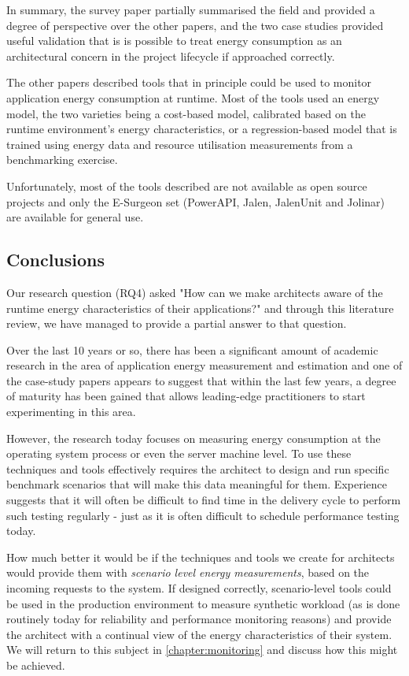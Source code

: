 In summary, the survey paper partially summarised the field and provided a degree of perspective over the other papers, and the two case studies provided useful validation that is is possible to treat energy consumption as an architectural concern in the project lifecycle if approached correctly.

The other papers described tools that in principle could be used to monitor application energy consumption at runtime.  Most of the tools used an energy model, the two varieties being a cost-based model, calibrated based on the runtime environment's energy characteristics, or a regression-based model that is trained using energy data and resource utilisation measurements from a benchmarking exercise.

Unfortunately, most of the tools described are not available as open source projects and only the E-Surgeon set (PowerAPI, Jalen, JalenUnit and Jolinar) are available for general use.


\subsection{Conclusions}

Our research question (RQ4) asked "How can we make architects aware of the runtime energy characteristics of their applications?" and through this literature review, we have managed to provide a partial answer to that question.

Over the last 10 years or so, there has been a significant amount of academic research in the area of application energy measurement and estimation and one of the case-study papers \cite{jagroep2016-comparingreleases} appears to suggest that within the last few years, a degree of maturity has been gained that allows leading-edge practitioners to start experimenting in this area.

However, the research today focuses on measuring energy consumption at the operating system process or even the server machine level.  To use these techniques and tools effectively requires the architect to design and run specific benchmark scenarios that will make this data meaningful for them.  Experience suggests that it will often be difficult to find time in the delivery cycle to perform such testing regularly - just as it is often difficult to schedule performance testing today.

How much better it would be if the techniques and tools we create for architects would provide them with \emph{scenario level energy measurements}, based on the incoming requests to the system.  If designed correctly, scenario-level tools could be used in the production environment to measure synthetic workload (as is done routinely today for reliability and performance monitoring reasons) and provide the architect with a continual view of the energy characteristics of their system.  We will return to this subject in \cref{chapter:monitoring} and discuss how this might be achieved.
